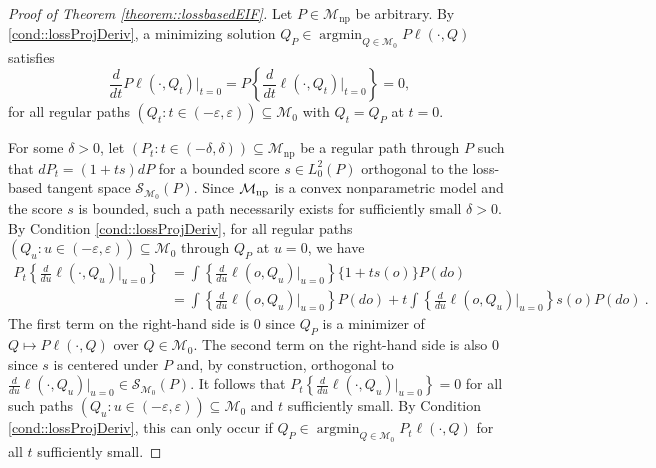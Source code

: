 \documentclass[11pt]{article}
\DeclareMathOperator*{\argmin}{argmin}
\theoremstyle{definition}
\begin{document}
 \begin{proof}[Proof of Theorem \ref{theorem::lossbasedEIF}]
 
Let $P \in \mathcal{M}_{\mathrm{np}}$ be arbitrary. By \ref{cond::lossProjDeriv}, a minimizing solution $Q_P \in  \argmin_{Q \in \mathcal{M}_0} P \ell (\cdot, Q)$ satisfies
$$ \frac{d}{dt} P  \ell(\cdot, Q_t)   \big|_{t=0}  = P \left\{ \frac{d}{dt} \ell(\cdot, Q_t) \big|_{t=0} \right\} = 0,$$
for all regular paths $(Q_t: t \in (-\varepsilon, \varepsilon)) \subseteq \mathcal{M}_0$ with $Q_t = Q_P$ at $t=0$. 

For some $\delta > 0$, let $(P_t : t \in (-\delta, \delta)) \subseteq \mathcal{M}_{\mathrm{np}}$ be a regular path through $P$ such that $dP_t = (1+ ts) dP$ for a bounded score $s \in L^2_0(P)$ orthogonal to the loss-based tangent space $\mathcal{S}_{\mathcal{M}_0}(P)$. Since ${\cal M}_{\mathrm{np}}$ is a convex nonparametric model and the score $s$ is bounded, such a path necessarily exists for sufficiently small $\delta > 0$. By Condition \ref{cond::lossProjDeriv}, for all regular paths $(Q_u: u \in (-\varepsilon, \varepsilon)) \subseteq \mathcal{M}_0$ through $Q_P$ at $u = 0$, we have
\begin{align*}
P_t \left\{ \frac{d}{du} \ell(\cdot, Q_u) \big|_{u=0} \right\}& = \int \left\{ \frac{d}{du} \ell(o, Q_u) \big|_{u=0} \right\}\{ 1+ t s(o)\} P(do)\\
&= \int \left\{ \frac{d}{du} \ell(o, Q_u) \big|_{u=0} \right\} P(do)  + t \int \left\{ \frac{d}{du} \ell(o, Q_u) \big|_{u=0} \right\} s(o) P(do)\ .
\end{align*}
 The first term on the right-hand side is $0$ since $Q_P$ is a minimizer of $Q \mapsto P \ell(\cdot, Q)$ over $Q \in \mathcal{M}_0$. The second term on the right-hand side is also $0$ since $s$ is centered under $P$ and, by construction, orthogonal to $\frac{d}{du} \ell(\cdot, Q_u) \big|_{u=0}  \in \mathcal{S}_{\mathcal{M}_0}(P)$. It follows that $P_t \left\{ \frac{d}{du} \ell(\cdot, Q_u) \big|_{u=0} \right\} = 0$ for all such paths $(Q_u: u \in (-\varepsilon, \varepsilon)) \subseteq \mathcal{M}_0$ and $t$ sufficiently small. By Condition \ref{cond::lossProjDeriv}, this can only occur if $Q_P \in \argmin_{Q \in \mathcal{M}_0} P_t \ell (\cdot, Q)$ for all $t$ sufficiently small. 
 

\end{proof}
\end{document}
